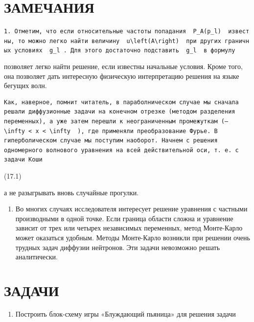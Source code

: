 \documentclass[
  ukrainian,
]{article}
\providecommand{\tightlist}{%
  \setlength{\itemsep}{0pt}\setlength{\parskip}{0pt}}
\begin{document}
\section{ЗАМЕЧАНИЯ}\label{ux437ux430ux43cux435ux447ux430ux43dux438ux44f}

\texttt{1.\ Отметим,\ что\ если\ относительные\ частоты\ попадания\ \ \textquotesingle{}P\_A(p\_l)\textquotesingle{}\ \ известны,\ то\ можно\ легко\ найти\ величину\ \ \textquotesingle{}u\textbackslash{}left(A\textbackslash{}right)\textquotesingle{}\ \ при\ других\ граничных\ условиях\ \ \textquotesingle{}g\_l\textquotesingle{}\ .\ Для\ этого\ достаточно\ подставить\ \ \textquotesingle{}g\_l\textquotesingle{}\ \ в\ формулу}

позволяет легко найти решение, если известны начальные условия. Кроме
того, она позволяет дать интересную физическую интерпретацию решения на
языке бегущих волн.

\begin{verbatim}
Как, наверное, помнит читатель, в параболническом случае мы сначала решали диффузионные задачи на конечном отрезке (методом разделения переменных), а уже затем перешли к неограниченным промежуткам (—   \infty < x < \infty  ), где применяли преобразование Фурье. В гиперболическом случае мы поступим наоборот. Начнем с решения одномерного волнового уравнения на всей действительной оси, т. е. с задачи Коши
\end{verbatim}

(17.1)

а не разыгрывать вновь случайные прогулки.

\begin{enumerate}
\def\labelenumi{\arabic{enumi}.}
\setcounter{enumi}{1}
\tightlist
\item
  Во многих случаях исследователя интересует решение уравнения с
  частными производными в одной точке. Если граница области сложна и
  уравнение зависит от трех или четырех независимых переменных, метод
  Монте-Карло может оказаться удобным. Методы Монте-Карло возникли при
  решении очень трудных задач диффузии нейтронов. Эти задачи невозможно
  решать аналитически.
\end{enumerate}

\section{ЗАДАЧИ}\label{ux437ux430ux434ux430ux447ux438}

\begin{enumerate}
\def\labelenumi{\arabic{enumi}.}
\tightlist
\item
  Построить блок-схему игры «Блуждающий пьяница» для решения задачи
\end{enumerate}
\end{document}
